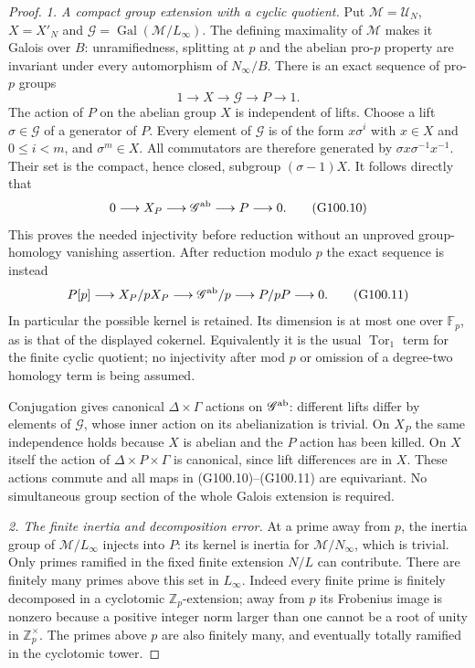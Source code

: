 \begin{proof}
\emph{1. A compact group extension with a cyclic quotient.}
Put $\mathcal M=\mathcal U_N$, $X=X'_N$ and
$\mathscr G=\operatorname{Gal}(\mathcal M/L_\infty)$.
The defining maximality of $\mathcal M$ makes it Galois over $B$:
unramifiedness, splitting at $p$ and the abelian pro-$p$ property
are invariant under every automorphism of $N_\infty/B$.
There is an exact sequence of pro-$p$ groups
\[
                   1\longrightarrow X\longrightarrow\mathscr G
                         \longrightarrow P\longrightarrow1.
 \tag{G100.9}
\]
The action of $P$ on the abelian group $X$ is independent of lifts.
Choose a lift $\sigma\in\mathscr G$ of a generator of $P$.
Every element of $\mathscr G$ is of the form $x\sigma^i$ with
$x\in X$ and $0\le i<m$, and $\sigma^m\in X$.
All commutators are therefore generated by
$\sigma x\sigma^{-1}x^{-1}$.
Their set is the compact, hence closed, subgroup $(\sigma-1)X$.
It follows directly that
\[
        0\longrightarrow X_P\longrightarrow\mathscr G^{\rm ab}
                          \longrightarrow P\longrightarrow0.
 \tag{G100.10}
\]
This proves the needed injectivity before reduction without an
unproved group-homology vanishing assertion.
After reduction modulo $p$ the exact sequence is instead
\[
 P[p]\longrightarrow X_P/pX_P\longrightarrow
       \mathscr G^{\rm ab}/p\longrightarrow P/pP\longrightarrow0.
 \tag{G100.11}
\]
In particular the possible kernel is retained.  Its dimension is
at most one over $\mathbb F_p$, as is that of the displayed
cokernel.  Equivalently it is the usual $\operatorname{Tor}_1$
term for the finite cyclic quotient; no injectivity after mod $p$
or omission of a degree-two homology term is being assumed.

Conjugation gives canonical $\Delta\times\Gamma$ actions on
$\mathscr G^{\rm ab}$: different lifts differ by elements of
$\mathscr G$, whose inner action on its abelianization is trivial.
On $X_P$ the same independence holds because $X$ is abelian
and the $P$ action has been killed.  On $X$ itself the action of
$\Delta\times P\times\Gamma$ is canonical, since lift differences
are in $X$.  These actions commute and all maps in
(G100.10)--(G100.11) are equivariant.  No simultaneous group section
of the whole Galois extension is required.

\emph{2. The finite inertia and decomposition error.}
At a prime away from $p$, the inertia group of
$\mathcal M/L_\infty$ injects into $P$: its kernel is inertia
for $\mathcal M/N_\infty$, which is trivial.
Only primes ramified in the fixed finite extension $N/L$ can
contribute.  There are finitely many primes above this set in
$L_\infty$.  Indeed every finite prime is finitely decomposed
in a cyclotomic $\mathbb Z_p$-extension; away from $p$ its
Frobenius image is nonzero because a positive integer norm larger
than one cannot be a root of unity in $\mathbb Z_p^\times$.
The primes above $p$ are also finitely many, and eventually totally
ramified in the cyclotomic tower.


\end{proof}
